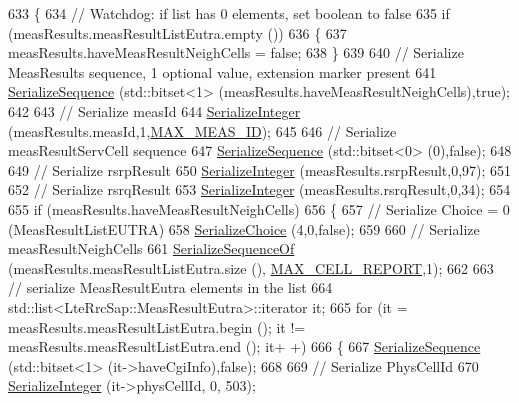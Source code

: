 \begin{DoxyCode}
633 \{
634   \textcolor{comment}{// Watchdog: if list has 0 elements, set boolean to false}
635   \textcolor{keywordflow}{if} (measResults.measResultListEutra.empty ())
636     \{
637       measResults.haveMeasResultNeighCells = \textcolor{keyword}{false};
638     \}
639 
640   \textcolor{comment}{// Serialize MeasResults sequence, 1 optional value, extension marker present}
641   \hyperlink{classns3_1_1Asn1Header_aa9744858380443ed95836fed08799aed}{SerializeSequence} (std::bitset<1> (measResults.haveMeasResultNeighCells),\textcolor{keyword}{true});
642 
643   \textcolor{comment}{// Serialize measId}
644   \hyperlink{classns3_1_1Asn1Header_ab1c3bd37730affa7473bc759d625c29a}{SerializeInteger} (measResults.measId,1,\hyperlink{lte-rrc-header_8cc_aa360afec99420ceee80ed487493f6a9d}{MAX\_MEAS\_ID});
645 
646   \textcolor{comment}{// Serialize measResultServCell sequence}
647   \hyperlink{classns3_1_1Asn1Header_aa9744858380443ed95836fed08799aed}{SerializeSequence} (std::bitset<0> (0),\textcolor{keyword}{false});
648 
649   \textcolor{comment}{// Serialize rsrpResult}
650   \hyperlink{classns3_1_1Asn1Header_ab1c3bd37730affa7473bc759d625c29a}{SerializeInteger} (measResults.rsrpResult,0,97);
651 
652   \textcolor{comment}{// Serialize rsrqResult}
653   \hyperlink{classns3_1_1Asn1Header_ab1c3bd37730affa7473bc759d625c29a}{SerializeInteger} (measResults.rsrqResult,0,34);
654 
655   \textcolor{keywordflow}{if} (measResults.haveMeasResultNeighCells)
656     \{
657       \textcolor{comment}{// Serialize Choice = 0 (MeasResultListEUTRA)}
658       \hyperlink{classns3_1_1Asn1Header_a400ef4a710499da80fc55e23a973d4fa}{SerializeChoice} (4,0,\textcolor{keyword}{false});
659 
660       \textcolor{comment}{// Serialize measResultNeighCells}
661       \hyperlink{classns3_1_1Asn1Header_a066b6dd077bde6b0c243f3eda2621277}{SerializeSequenceOf} (measResults.measResultListEutra.size (),
      \hyperlink{lte-rrc-header_8cc_a0a29c59f448f689482054e43277599ab}{MAX\_CELL\_REPORT},1);
662 
663       \textcolor{comment}{// serialize MeasResultEutra elements in the list}
664       std::list<LteRrcSap::MeasResultEutra>::iterator it;
665       \textcolor{keywordflow}{for} (it = measResults.measResultListEutra.begin (); it != measResults.measResultListEutra.end (); it+
      +)
666         \{
667           \hyperlink{classns3_1_1Asn1Header_aa9744858380443ed95836fed08799aed}{SerializeSequence} (std::bitset<1> (it->haveCgiInfo),\textcolor{keyword}{false});
668 
669           \textcolor{comment}{// Serialize PhysCellId}
670           \hyperlink{classns3_1_1Asn1Header_ab1c3bd37730affa7473bc759d625c29a}{SerializeInteger} (it->physCellId, 0, 503);

\end{DoxyCode}
